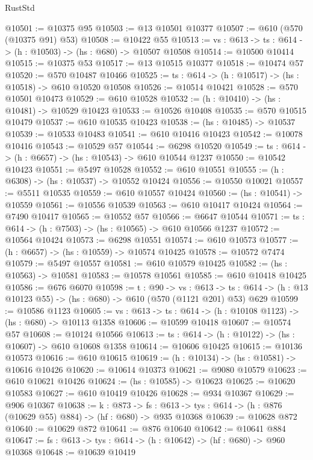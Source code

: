 \begin{lexlean}{RustStd}
\begin{coremodule}
@10501 := @10375 @95
@10503 := @13 @10501 @10377
@10507 := @610 (@570 (@10375 @91) @53)
@10508 := @10422 @55
@10513 := {vs : @613} -> {ts : @614} -> (h : @10503) -> (hs : @680) -> @10507 @10508
@10514 := @10500 @10414
@10515 := @10375 @53
@10517 := @13 @10515 @10377
@10518 := @10474 @57
@10520 := @570 @10487 @10466
@10525 := {ts : @614} -> (h : @10517) -> (hs : @10518) -> @610 @10520 @10508
@10526 := @10514 @10421
@10528 := @570 @10501 @10473
@10529 := @610 @10528
@10532 := (h : @10410) -> (hs : @10481) -> @10529 @10423
@10533 := @10526 @10408
@10535 := @570 @10515 @10479
@10537 := @610 @10535 @10423
@10538 := (hs : @10485) -> @10537
@10539 := @10533 @10483
@10541 := @610 @10416 @10423
@10542 := @10078 @10416
@10543 := @10529 @57
@10544 := @6298 @10520
@10549 := {ts : @614} -> (h : @6657) -> (hs : @10543) -> @610 @10544 @1237
@10550 := @10542 @10423
@10551 := @5497 @10528
@10552 := @610 @10551
@10555 := (h : @6308) -> (hs : @10537) -> @10552 @10424
@10556 := @10550 @10021
@10557 := @5511 @10535
@10559 := @610 @10557 @10424
@10560 := (hs : @10541) -> @10559
@10561 := @10556 @10539
@10563 := @610 @10417 @10424
@10564 := @7490 @10417
@10565 := @10552 @57
@10566 := @6647 @10544
@10571 := {ts : @614} -> (h : @7503) -> (hs : @10565) -> @610 @10566 @1237
@10572 := @10564 @10424
@10573 := @6298 @10551
@10574 := @610 @10573
@10577 := (h : @6657) -> (hs : @10559) -> @10574 @10425
@10578 := @10572 @7474
@10579 := @5497 @10557
@10581 := @610 @10579 @10425
@10582 := (hs : @10563) -> @10581
@10583 := @10578 @10561
@10585 := @610 @10418 @10425
@10586 := @676 @6070
@10598 := {t : @90} ->
  {vs : @613} ->
  {ts : @614} -> (h : @13 @10123 @55) -> (hs : @680) -> @610 (@570 (@1121 @201) @53) @629
@10599 := @10586 @1123
@10605 := {vs : @613} -> {ts : @614} -> (h : @10108 @1123) -> (hs : @680) -> @10113 @1358
@10606 := @10599 @10418
@10607 := @10574 @57
@10608 := @10124 @10566
@10613 := {ts : @614} -> (h : @10122) -> (hs : @10607) -> @610 @10608 @1358
@10614 := @10606 @10425
@10615 := @10136 @10573
@10616 := @610 @10615
@10619 := (h : @10134) -> (hs : @10581) -> @10616 @10426
@10620 := @10614 @10373
@10621 := @9080 @10579
@10623 := @610 @10621 @10426
@10624 := (hs : @10585) -> @10623
@10625 := @10620 @10583
@10627 := @610 @10419 @10426
@10628 := @934 @10367
@10629 := @906 @10367
@10638 := {k : @873} ->
  {fs : @613} -> {tys : @614} -> (h : @876 (@10629 @55) @884) -> (hf : @680) -> @935 @10368
@10639 := @10628 @872
@10640 := @10629 @872
@10641 := @876 @10640
@10642 := @10641 @884
@10647 := {fs : @613} -> {tys : @614} -> (h : @10642) -> (hf : @680) -> @960 @10368
@10648 := @10639 @10419

\end{coremodule}
\end{lexlean}
